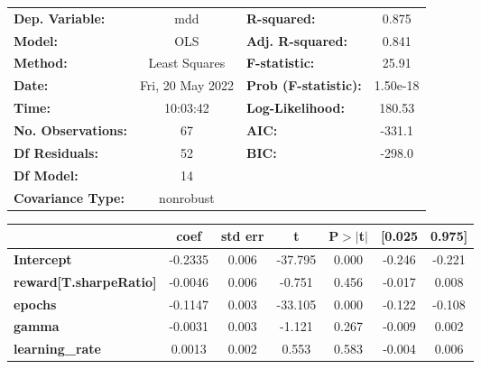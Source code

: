 \begin{center}
\begin{tabular}{lclc}
\toprule
\textbf{Dep. Variable:}              &       mdd        & \textbf{  R-squared:         } &     0.875   \\
\textbf{Model:}                      &       OLS        & \textbf{  Adj. R-squared:    } &     0.841   \\
\textbf{Method:}                     &  Least Squares   & \textbf{  F-statistic:       } &     25.91   \\
\textbf{Date:}                       & Fri, 20 May 2022 & \textbf{  Prob (F-statistic):} &  1.50e-18   \\
\textbf{Time:}                       &     10:03:42     & \textbf{  Log-Likelihood:    } &    180.53   \\
\textbf{No. Observations:}           &          67      & \textbf{  AIC:               } &    -331.1   \\
\textbf{Df Residuals:}               &          52      & \textbf{  BIC:               } &    -298.0   \\
\textbf{Df Model:}                   &          14      & \textbf{                     } &             \\
\textbf{Covariance Type:}            &    nonrobust     & \textbf{                     } &             \\
\bottomrule
\end{tabular}
\begin{tabular}{lcccccc}
                                     & \textbf{coef} & \textbf{std err} & \textbf{t} & \textbf{P$> |$t$|$} & \textbf{[0.025} & \textbf{0.975]}  \\
\midrule
\textbf{Intercept}                   &      -0.2335  &        0.006     &   -37.795  &         0.000        &       -0.246    &       -0.221     \\
\textbf{reward[T.sharpeRatio]}       &      -0.0046  &        0.006     &    -0.751  &         0.456        &       -0.017    &        0.008     \\
\textbf{epochs}                      &      -0.1147  &        0.003     &   -33.105  &         0.000        &       -0.122    &       -0.108     \\
\textbf{gamma}                       &      -0.0031  &        0.003     &    -1.121  &         0.267        &       -0.009    &        0.002     \\
\textbf{learning\_rate}              &       0.0013  &        0.002     &     0.553  &         0.583        &       -0.004    &        0.006     \\

\end{tabular}
\end{center}
